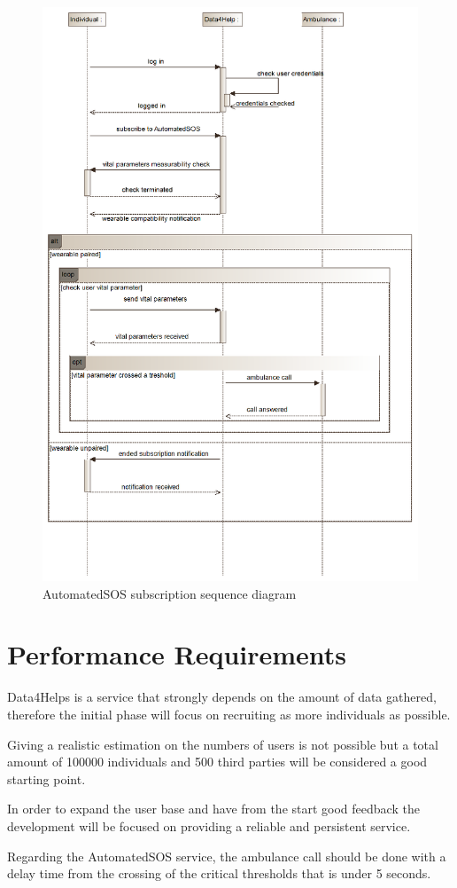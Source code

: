 \begin{figure}[H]
	\centering
  \includegraphics[width=0.70\linewidth]{resources/UML/AutomatedSOSsequence.png}
  \caption{AutomatedSOS subscription sequence diagram}
  \label{fig: AutomatedSOS sequence diagram}
\end{figure}



\section{Performance Requirements}
Data4Helps is a service that strongly depends on the amount of data gathered, therefore the initial phase will focus on recruiting as more individuals as possible.

Giving a realistic estimation on the numbers of users is not possible but a total amount of 100000 individuals and 500 third parties will be considered a good starting point.

In order to expand the user base and have from the start good feedback the development will be focused on providing a reliable and persistent service. 

Regarding the AutomatedSOS service, the ambulance call should be done with a delay time from the crossing of the critical thresholds that is under 5 seconds.

